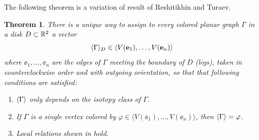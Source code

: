 \documentclass{amsart}
\newtheorem{thm}{Theorem}[section]
\newcommand{\Ga}{\Gamma}
\newcommand{\ph}{\varphi}
\begin{document}
The following theorem is a variation of result of Reshitikhin and Turaev. 
\begin{thm}\label{t:RT}
  There is a unique  way to assign to every colored
  planar graph $\Ga$ in a disk $D\subset \mathbb{R}^2$ a vector
  \begin{equation}
    \<\Ga\>_D\in \langle V(\ee_1), \dots, V(\ee_n) \rangle
  \end{equation}
  where $\ee_1,\dots, \ee_n$ are the edges of $\Ga$ meeting the boundary
  of $D$ (legs), taken in counterclockwise order and with outgoing orientation,
  so that that following conditions are satisfied:
  \begin{enumerate}
     \item $\<\Ga\>$ only depends on the isotopy  class of $\Ga$.

    \item If $\Ga$ is a single vertex colored by
          $\ph\in \langle V(\ee_1), \dots,  V(\ee_n)\rangle$, then $\<\Ga\>=\ph$.
     
    \item Local relations shown in  hold. 



\end{enumerate}
\end{thm}
\end{document}
